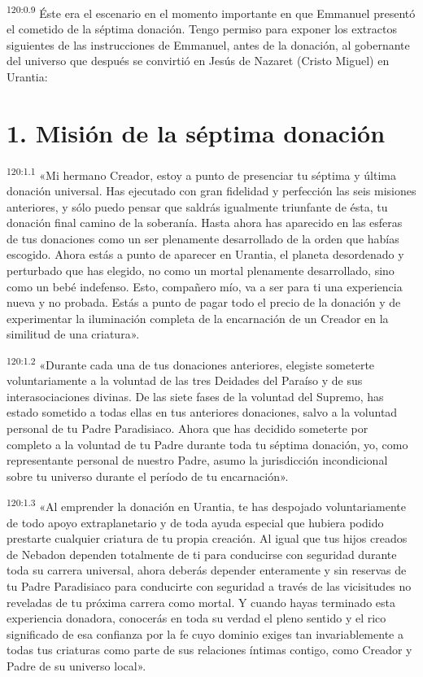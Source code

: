 \par 
\textsuperscript{120:0.9} Éste era el escenario en el momento importante en que Emmanuel presentó el cometido de la séptima donación. Tengo permiso para exponer los extractos siguientes de las instrucciones de Emmanuel, antes de la donación, al gobernante del universo que después se convirtió en Jesús de Nazaret (Cristo Miguel) en Urantia:

\section*{1. Misión de la séptima donación}
\par 
\textsuperscript{120:1.1} «Mi hermano Creador, estoy a punto de presenciar tu séptima y última donación universal. Has ejecutado con gran fidelidad y perfección las seis misiones anteriores, y sólo puedo pensar que saldrás igualmente triunfante de ésta, tu donación final camino de la soberanía. Hasta ahora has aparecido en las esferas de tus donaciones como un ser plenamente desarrollado de la orden que habías escogido. Ahora estás a punto de aparecer en Urantia, el planeta desordenado y perturbado que has elegido, no como un mortal plenamente desarrollado, sino como un bebé indefenso. Esto, compañero mío, va a ser para ti una experiencia nueva y no probada. Estás a punto de pagar todo el precio de la donación y de experimentar la iluminación completa de la encarnación de un Creador en la similitud de una criatura».

\par 
\textsuperscript{120:1.2} «Durante cada una de tus donaciones anteriores, elegiste someterte voluntariamente a la voluntad de las tres Deidades del Paraíso y de sus interasociaciones divinas. De las siete fases de la voluntad del Supremo, has estado sometido a todas ellas en tus anteriores donaciones, salvo a la voluntad personal de tu Padre Paradisiaco. Ahora que has decidido someterte por completo a la voluntad de tu Padre durante toda tu séptima donación, yo, como representante personal de nuestro Padre, asumo la jurisdicción incondicional sobre tu universo durante el período de tu encarnación».

\par 
\textsuperscript{120:1.3} «Al emprender la donación en Urantia, te has despojado voluntariamente de todo apoyo extraplanetario y de toda ayuda especial que hubiera podido prestarte cualquier criatura de tu propia creación. Al igual que tus hijos creados de Nebadon dependen totalmente de ti para conducirse con seguridad durante toda su carrera universal, ahora deberás depender enteramente y sin reservas de tu Padre Paradisiaco para conducirte con seguridad a través de las vicisitudes no reveladas de tu próxima carrera como mortal. Y cuando hayas terminado esta experiencia donadora, conocerás en toda su verdad el pleno sentido y el rico significado de esa confianza por la fe cuyo dominio exiges tan invariablemente a todas tus criaturas como parte de sus relaciones íntimas contigo, como Creador y Padre de su universo local».

